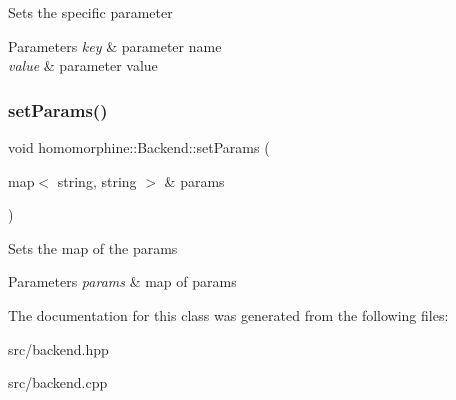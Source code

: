 Sets the specific parameter


\begin{DoxyParams}{Parameters}
{\em key} & parameter name \\
\hline
{\em value} & parameter value \\
\hline
\end{DoxyParams}
\mbox{\label{classhomomorphine_1_1_backend_aed04b9aa4eb2c08801e099b16b4da4b0}} 
\subsubsection{\texorpdfstring{setParams()}{setParams()}}
{\footnotesize\ttfamily void homomorphine\+::\+Backend\+::set\+Params (\begin{DoxyParamCaption}\item[{map$<$ string, string $>$ \&}]{params }\end{DoxyParamCaption})}

Sets the map of the params


\begin{DoxyParams}{Parameters}
{\em params} & map of params \\
\hline
\end{DoxyParams}


The documentation for this class was generated from the following files\+:\begin{DoxyCompactItemize}
\item 
src/backend.\+hpp\item 
src/backend.\+cpp\end{DoxyCompactItemize}
